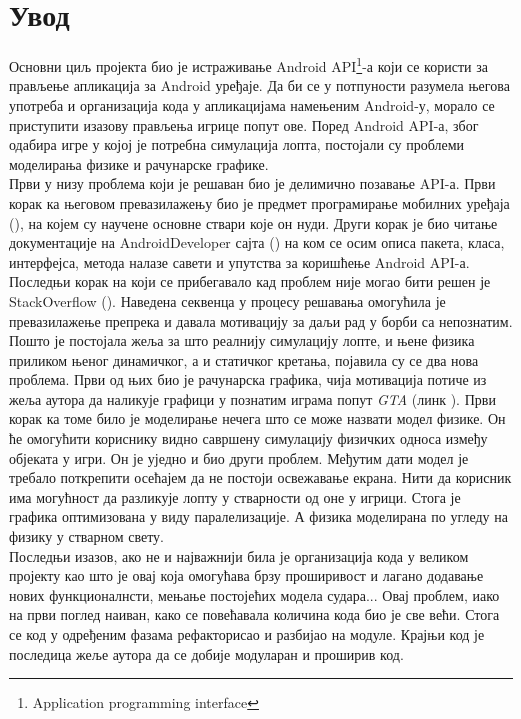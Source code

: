 
\chapter{Увод}
Основни циљ пројекта био је истраживање Android API\footnote{Application programming interface}-а који се користи за прављење апликација за Android уређаје. Да би се у потпуности разумела његова употреба и организација кода у апликацијама намењеним Android-у, морало се приступити изазову прављења игрице попут ове. Поред Android API-а, због одабира игре у којој је потребна симулација лопта, постојали су проблеми моделирања физике и рачунарске графике.
\\ \indent Први у низу проблема који је решаван био је делимично позавање API-а. Први корак ка његовом превазилажењу био је предмет програмирање мобилних уређаја (\cite{PMU}), на којем су научене основне ствари које он нуди. Други корак је био читање документације на AndroidDeveloper сајта (\cite{AndroidDeveloper}) на ком се осим описа пакета, класа, интерфејса, метода налазе савети и упутства за коришћење Android API-а. Последњи корак на који се прибегавало кад проблем није могао бити решен је StackOverflow (\cite{StackOverflow}). Наведена секвенца у процесу решавања омогућила је превазилажење препрека и давала мотивацију за даљи рад у борби са непознатим.
\\ \indent Пошто је постојала жеља за што реалнију симулацију лопте, и њене физика приликом њеног динамичког, а и статичког кретања, појавила су се два нова проблема. Први од њих био је рачунарска графика, чија мотивација  потиче из жеља аутора да наликује графици у познатим играма попут \emph{GTA} (линк \cite{GTA}). Први корак ка томе било је моделирање нечега што се може назвати модел физике. Он ће омогућити кориснику видно савршену симулацију физичких односа између објеката у игри. Он је уједно и био други проблем. Међутим дати модел је требало поткрепити осећајем да не постоји освежавање екрана. Нити да корисник има могућност да разликује лопту у стварности од оне у игрици. Стога је графика оптимизована у виду паралелизације. А физика моделирана по угледу на физику у стварном свету.
\\ \indent Последњи изазов, ако не и најважнији била је организација кода у великом пројекту као што је овај која омогућава брзу проширивост и лагано додавање нових функционалнсти, мењање постојећих модела судара... Овај проблем, иако на први поглед наиван, како се повећавала количина кода био је све већи. Стога се код у одређеним фазама рефакторисао и разбијао на модуле. Крајњи код је последица жеље аутора да се добије модуларан и проширив код.


